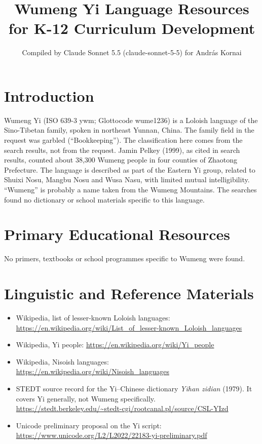 \documentclass[12pt]{article}
\title{Wumeng Yi Language Resources for K-12 Curriculum Development}
\author{Compiled by Claude Sonnet 5.5 (claude-sonnet-5-5) for Andr\'as Kornai}
\date{}
\begin{document}
\maketitle

\section{Introduction}
Wumeng Yi (ISO 639-3 ywm; Glottocode wume1236) is a Loloish language of the Sino-Tibetan family, spoken in northeast Yunnan, China. The family field in the request was garbled (``Bookkeeping''). The classification here comes from the search results, not from the request. Jamin Pelkey (1999), as cited in search results, counted about 38,300 Wumeng people in four counties of Zhaotong Prefecture. The language is described as part of the Eastern Yi group, related to Shuixi Nosu, Mangbu Nosu and Wusa Nasu, with limited mutual intelligibility. ``Wumeng'' is probably a name taken from the Wumeng Mountains. The searches found no dictionary or school materials specific to this language.

\section{Primary Educational Resources}
No primers, textbooks or school programmes specific to Wumeng were found.

\section{Linguistic and Reference Materials}
\begin{itemize}
\item Wikipedia, list of lesser-known Loloish languages: \url{https://en.wikipedia.org/wiki/List_of_lesser-known_Loloish_languages}
\item Wikipedia, Yi people: \url{https://en.wikipedia.org/wiki/Yi_people}
\item Wikipedia, Nisoish languages: \url{https://en.wikipedia.org/wiki/Nisoish_languages}
\item STEDT source record for the Yi--Chinese dictionary \emph{Yihan zidian} (1979). It covers Yi generally, not Wumeng specifically. \url{https://stedt.berkeley.edu/~stedt-cgi/rootcanal.pl/source/CSL-YIzd}
\item Unicode preliminary proposal on the Yi script: \url{https://www.unicode.org/L2/L2022/22183-yi-preliminary.pdf}
\end{itemize}
\end{document}
